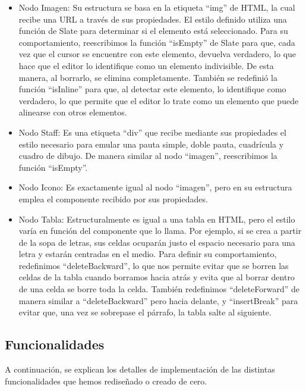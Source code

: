 \begin{itemize}
  \item Nodo Imagen: Su estructura se basa en la etiqueta ``img'' de HTML, la cual recibe una URL a través de sus propiedades. El estilo definido utiliza una función de Slate para determinar si el elemento está seleccionado. Para su comportamiento, reescribimos la función ``isEmpty'' de Slate para que, cada vez que el cursor se encuentre con este elemento, devuelva verdadero, lo que hace que el editor lo identifique como un elemento indivisible. De esta manera, al borrarlo, se elimina completamente. También se redefinió la función ``isInline'' para que, al detectar este elemento, lo identifique como verdadero, lo que permite que el editor lo trate como un elemento que puede alinearse con otros elementos.
  \item Nodo Staff: Es una etiqueta ``div'' que recibe mediante sus propiedades el estilo necesario para emular una pauta simple, doble pauta, cuadrícula y cuadro de dibujo. De manera similar al nodo ``imagen'', reescribimos la función ``isEmpty''.
  \item Nodo Icono: Es exactamente igual al nodo ``imagen'', pero en su estructura emplea el componente recibido por sus propiedades.
  \item Nodo Tabla: Estructuralmente es igual a una tabla en HTML, pero el estilo varía en función del componente que lo llama. Por ejemplo, si se crea a partir de la sopa de letras, sus celdas ocuparán justo el espacio necesario para una letra y estarán centradas en el medio. Para definir su comportamiento, redefinimos ``deleteBackward'', lo que nos permite evitar que se borren las celdas de la tabla cuando borramos hacia atrás y evita que al borrar dentro de una celda se borre toda la celda. También redefinimos ``deleteForward'' de manera similar a ``deleteBackward'' pero hacia delante, y ``insertBreak'' para evitar que, una vez se sobrepase el párrafo, la tabla salte al siguiente.
\end{itemize}

\subsection{Funcionalidades}
A continuación, se explican los detalles de implementación de las distintas funcionalidades que hemos rediseñado o creado de cero.


